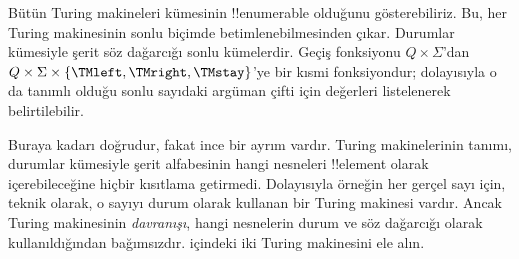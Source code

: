 \documentclass[../../../include/open-logic-section]{subfiles}
\begin{document}

\begin{explain}
Bütün Turing makineleri kümesinin !!{enumerable} olduğunu gösterebiliriz.
Bu, her Turing makinesinin sonlu biçimde betimlenebilmesinden çıkar. Durumlar
kümesiyle şerit söz dağarcığı sonlu kümelerdir. Geçiş fonksiyonu
$Q\times\Sigma$'dan
$Q\times\Sigma\times\{\TMleft,\TMright,\TMstay\}$'ye bir kısmi
fonksiyondur; dolayısıyla o da tanımlı olduğu sonlu sayıdaki argüman çifti
için değerleri listelenerek belirtilebilir.

Buraya kadarı doğrudur, fakat ince bir ayrım vardır. Turing makinelerinin
tanımı, durumlar kümesiyle şerit alfabesinin hangi nesneleri !!{element}
olarak içerebileceğine hiçbir kısıtlama getirmedi. Dolayısıyla örneğin her
gerçel sayı için, teknik olarak, o sayıyı durum olarak kullanan bir Turing
makinesi vardır. Ancak Turing makinesinin \emph{davranışı}, hangi nesnelerin
durum ve söz dağarcığı olarak kullanıldığından bağımsızdır.
 içindeki iki Turing makinesini ele alın.
\begin{figure}
\begin{center}
\\
\end{center}
\end{figure}
\end{explain}
\end{document}
